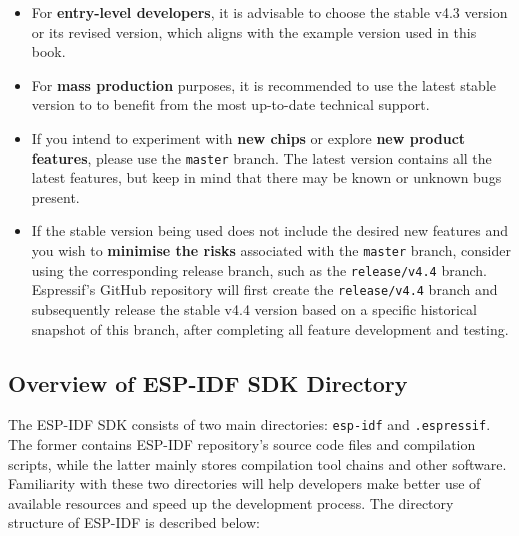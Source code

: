 \documentclass[a4paper,12pt,openany]{book}
\begin{document}
\begin{itemize}[leftmargin=1.5em]
    \item For \textbf{entry-level developers}, it is advisable to choose the stable v4.3 version or its revised version, which aligns with the example version used in this book.
    \item For \textbf{mass production} purposes, it is recommended to use the latest stable version to to benefit from the most up-to-date technical support.
    \item If you intend to experiment with \textbf{new chips} or explore \textbf{new product features}, please use the \verb|master| branch. The latest version contains all the latest features, but keep in mind that there may be known or unknown bugs present.
    \item If the stable version being used does not include the desired new features and you wish to \textbf{minimise the risks} associated with the \verb|master| branch, consider using the corresponding release branch, such as the \verb|release/v4.4| branch. Espressif’s GitHub repository will first create the \verb|release/v4.4| branch and subsequently release the stable v4.4 version based on a specific historical snapshot of this branch, after completing all feature development and testing.
\end{itemize}

\subsection{Overview of ESP-IDF SDK Directory}
The ESP-IDF SDK consists of two main directories: \verb|esp-idf| and \verb|.espressif|. The former contains ESP-IDF repository’s source code files and compilation scripts, while the latter mainly stores compilation tool chains and other software. Familiarity with these two directories will help developers make better use of available resources and speed up the development process. The directory structure of ESP-IDF is described below:
\end{document}
